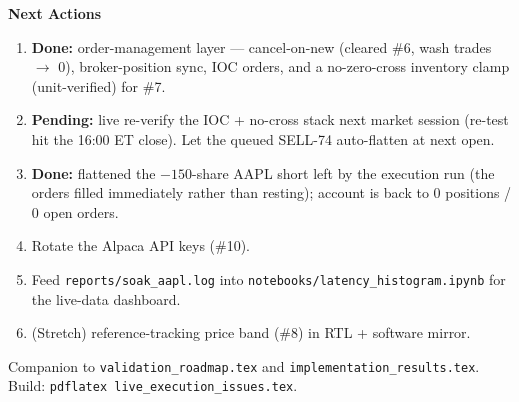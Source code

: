 \documentclass[10pt,a4paper]{article}
\begin{document}
{\large\bfseries\color{hdrblue} Next Actions}
\begin{enumerate}[leftmargin=1.6em,topsep=2pt,itemsep=1pt]
\item \textcolor{okgreen}{\textbf{Done:}} order-management layer --- cancel-on-new
      (cleared \#6, wash trades $\to$ 0), broker-position sync, IOC orders, and a
      no-zero-cross inventory clamp (unit-verified) for \#7.
\item \textbf{Pending:} live re-verify the IOC + no-cross stack next market
      session (re-test hit the 16:00 ET close). Let the queued SELL-74 auto-flatten
      at next open.
\item \textcolor{okgreen}{\textbf{Done:}} flattened the $-150$-share AAPL short
      left by the execution run (the orders filled immediately rather than
      resting); account is back to 0 positions / 0 open orders.
\item Rotate the Alpaca API keys (\#10).
\item Feed \texttt{reports/soak\_aapl.log} into
      \texttt{notebooks/latency\_histogram.ipynb} for the live-data dashboard.
\item (Stretch) reference-tracking price band (\#8) in RTL + software mirror.
\end{enumerate}

\vfill
{\small\color{rulegray} Companion to \texttt{validation\_roadmap.tex} and
\texttt{implementation\_results.tex}. Build: \texttt{pdflatex
live\_execution\_issues.tex}.}
\end{document}
